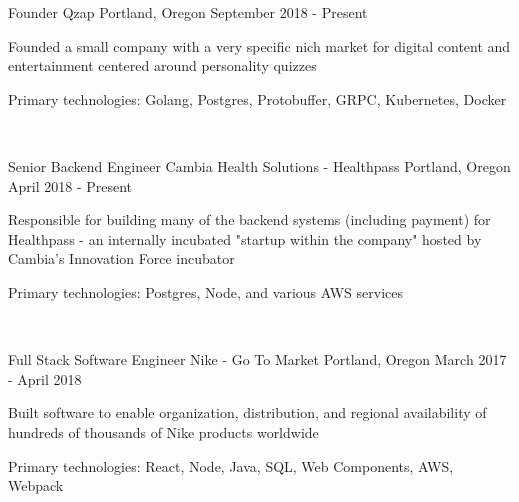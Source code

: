 
\begin{cventries}

  \cventry
  {Founder}
  {Qzap}
  {Portland, Oregon}
  {September 2018 - Present}
  {
    \begin{cvitems}
      \item {Founded a small company with a very specific nich market for digital content and entertainment centered around personality quizzes}
      \item {Primary technologies: Golang, Postgres, Protobuffer, GRPC, Kubernetes, Docker}
    \end{cvitems}
  }

  ~

  \cventry
  {Senior Backend Engineer}
  {Cambia Health Solutions - Healthpass}
  {Portland, Oregon}
  {April 2018 - Present}
  {
    \begin{cvitems}
      \item {Responsible for building many of the backend systems (including payment) for Healthpass - an internally incubated "startup within the company" hosted by Cambia's Innovation Force incubator}
      \item {Primary technologies: Postgres, Node, and various AWS services}
    \end{cvitems}
  }

  ~

  \cventry
  {Full Stack Software Engineer}
  {Nike - Go To Market}
  {Portland, Oregon}
  {March 2017 - April 2018}
  {
    \begin{cvitems}
      \item {Built software to enable organization, distribution, and regional availability of hundreds of thousands of Nike products worldwide}
      \item {Primary technologies: React, Node, Java, SQL, Web Components, AWS, Webpack}
    \end{cvitems}
  }

  ~




\end{cventries}
